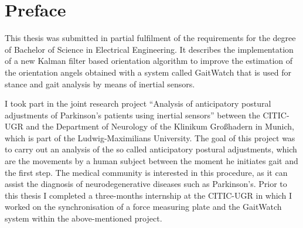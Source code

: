 \chapter*{Preface}

This thesis was submitted in partial fulfilment of the requirements for the degree of Bachelor of Science in Electrical Engineering. It describes the implementation of a new Kalman filter based orientation algorithm to improve the estimation of the orientation angels obtained with a system called GaitWatch that is used for stance and gait analysis by means of inertial sensors.

I took part in the joint research project “Analysis of anticipatory postural adjustments of Parkinson’s patients using inertial sensors” between the \gls{CITIC-UGR} and the Department of Neurology of the Klinikum Großhadern in Munich, which is part of the Ludwig-Maximilians University. The goal of this project was to carry out an analysis of the so called anticipatory postural adjustments, which are the movements by a human subject between the moment he initiates gait and the first step. The medical community is interested in this procedure, as it can assist the diagnosis of neurodegenerative diseases such as Parkinson's. Prior to this thesis I completed a three-months internship at the \gls{CITIC-UGR} in which I worked on the synchronisation of a force measuring plate and the GaitWatch system within the above-mentioned project.